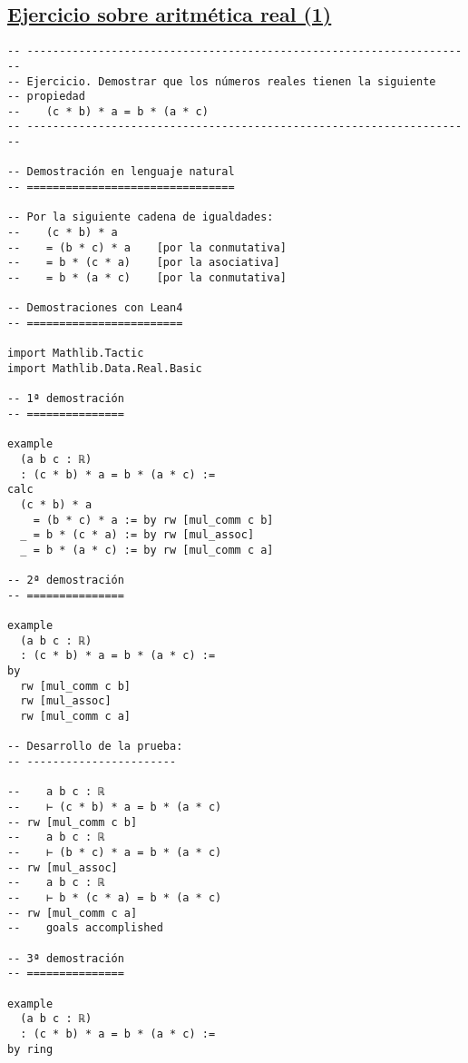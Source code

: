 \subsection{\href{./src/Basicos/Ejercicio\_sobre\_aritmetica\_real\_1.lean}{Ejercicio sobre aritmética real (1)}}
\label{sec:org03d4d85}
\begin{verbatim}
-- ---------------------------------------------------------------------
-- Ejercicio. Demostrar que los números reales tienen la siguiente
-- propiedad
--    (c * b) * a = b * (a * c)
-- ---------------------------------------------------------------------

-- Demostración en lenguaje natural
-- ================================

-- Por la siguiente cadena de igualdades:
--    (c * b) * a
--    = (b * c) * a    [por la conmutativa]
--    = b * (c * a)    [por la asociativa]
--    = b * (a * c)    [por la conmutativa]

-- Demostraciones con Lean4
-- ========================

import Mathlib.Tactic
import Mathlib.Data.Real.Basic

-- 1ª demostración
-- ===============

example
  (a b c : ℝ)
  : (c * b) * a = b * (a * c) :=
calc
  (c * b) * a
    = (b * c) * a := by rw [mul_comm c b]
  _ = b * (c * a) := by rw [mul_assoc]
  _ = b * (a * c) := by rw [mul_comm c a]

-- 2ª demostración
-- ===============

example
  (a b c : ℝ)
  : (c * b) * a = b * (a * c) :=
by
  rw [mul_comm c b]
  rw [mul_assoc]
  rw [mul_comm c a]

-- Desarrollo de la prueba:
-- -----------------------

--    a b c : ℝ
--    ⊢ (c * b) * a = b * (a * c)
-- rw [mul_comm c b]
--    a b c : ℝ
--    ⊢ (b * c) * a = b * (a * c)
-- rw [mul_assoc]
--    a b c : ℝ
--    ⊢ b * (c * a) = b * (a * c)
-- rw [mul_comm c a]
--    goals accomplished

-- 3ª demostración
-- ===============

example
  (a b c : ℝ)
  : (c * b) * a = b * (a * c) :=
by ring
\end{verbatim}

